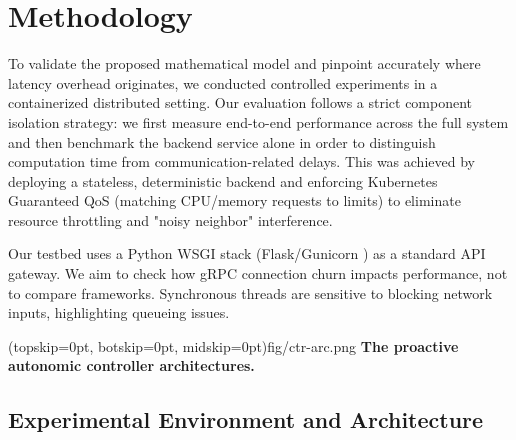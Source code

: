 \documentclass{ieeeaccess}
\begin{document}
\section{Methodology}
\label{sec4}

To validate the proposed mathematical model and pinpoint accurately where latency overhead originates, we conducted controlled experiments in a containerized distributed setting. Our evaluation follows a strict component isolation strategy: we first measure end-to-end performance across the full system and then benchmark the backend service alone in order to distinguish computation time from communication-related delays. This was achieved by deploying a stateless, deterministic backend and enforcing Kubernetes Guaranteed QoS (matching CPU/memory requests to limits) to eliminate resource throttling and "noisy neighbor" interference. 

Our testbed uses a Python WSGI stack (Flask/Gunicorn \cite{gunicorn}) as a standard API gateway. We aim to check how gRPC connection churn impacts performance, not to compare frameworks. Synchronous threads are sensitive to blocking network inputs, highlighting queueing issues.



\Figure[t!](topskip=0pt, botskip=0pt, midskip=0pt){fig/ctr-arc.png}
{ 
	\textbf{The proactive autonomic controller architectures.}
	\label{fig1}
}

\subsection{Experimental Environment and Architecture}
\label{sec4.1}
\end{document}
